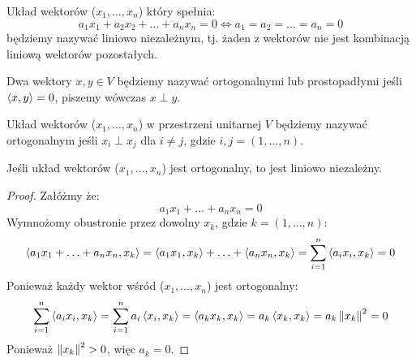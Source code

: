 \begin{definition}
    Układ wektorów ($x_1, \ldots, x_n$) który spełnia:
    $$ a_1x_1 + a_2x_2 + \ldots + a_nx_n = 0 \iff a_1 = a_2 = \ldots = a_n = 0$$
    będziemy nazywać liniowo niezależnym, tj. żaden z wektorów nie jest kombinacją liniową wektorów pozostałych.
\end{definition}
\begin{definition}
    Dwa wektory $x, y \in V$ będziemy nazywać ortogonalnymi lub prostopadłymi jeśli $\left\langle x, y \right\rangle = 0$, piszemy wówczas $x \perp y$.
\end{definition}
\begin{definition}
    Układ wektorów ($x_1, \ldots, x_n$) w przestrzeni unitarnej $V$ będziemy nazywać ortogonalnym jeśli $x_i \perp x_j$ dla $i \ne j$, gdzie $i,j = (1, \ldots, n)$.
\end{definition}
\begin{theorem}
    Jeśli układ wektorów ($x_1, \ldots, x_n$) jest ortogonalny, to jest liniowo niezależny.
\end{theorem}
\begin{proof}
    Załóżmy że:
    $$ a_1x_1 + \ldots + a_nx_n = 0$$
    Wymnożomy obustronie przez dowolny $x_k$, gdzie $k = (1, \ldots, n)$:
    $$ \left\langle a_1x_1 + \ldots + a_nx_n, x_k \right\rangle = \left\langle a_1x_1, x_k \right\rangle + \ldots + \left\langle a_nx_n, x_k \right\rangle = \sum_{i=1}^{n}{\left\langle a_ix_i, x_k \right\rangle} = 0 $$
    Ponieważ każdy wektor wśród ($x_1, \ldots, x_n$) jest ortogonalny:
    $$ \sum_{i=1}^{n}{\left\langle a_ix_i, x_k \right\rangle} = \sum_{i=1}^{n}{a_i\left\langle x_i, x_k \right\rangle} = \left\langle a_kx_k, x_k \right\rangle = a_k\left\langle x_k, x_k \right\rangle = a_k\left\| x_k \right\|^2 = 0 $$
    Ponieważ $\left\| x_k \right\|^2 > 0$, więc $a_k = 0$.
\end{proof}

